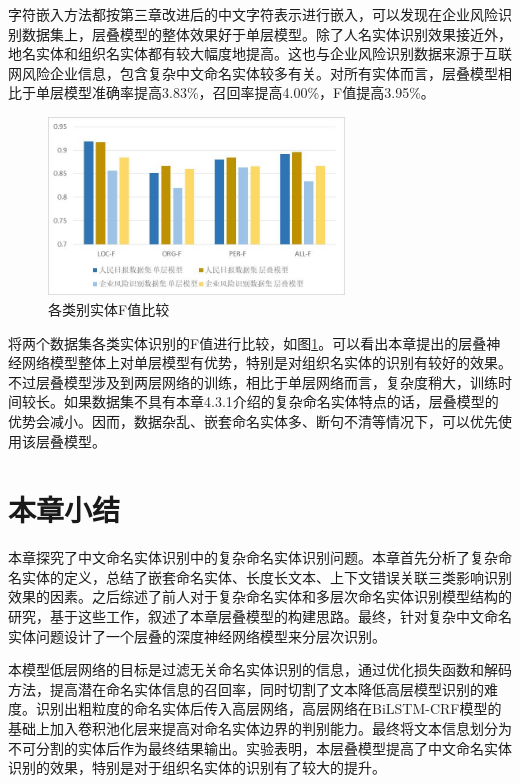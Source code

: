 \documentclass[winfonts,master,oneside,nobackinfo]{njuthesis}
\begin{document}
字符嵌入方法都按第三章改进后的中文字符表示进行嵌入，可以发现在企业风险识别数据集上，层叠模型的整体效果好于单层模型。除了人名实体识别效果接近外，地名实体和组织名实体都有较大幅度地提高。这也与企业风险识别数据来源于互联网风险企业信息，包含复杂中文命名实体较多有关。对所有实体而言，层叠模型相比于单层模型准确率提高3.83\%，召回率提高4.00\%，F值提高3.95\%。


\begin{figure}[h]
\centering
\includegraphics[width=0.7\textwidth]{./figure/层叠模型F值比较.jpg}
\caption{各类别实体F值比较}
\label{compare}
\end{figure}

将两个数据集各类实体识别的F值进行比较，如图\ref{compare}。可以看出本章提出的层叠神经网络模型整体上对单层模型有优势，特别是对组织名实体的识别有较好的效果。不过层叠模型涉及到两层网络的训练，相比于单层网络而言，复杂度稍大，训练时间较长。如果数据集不具有本章4.3.1介绍的复杂命名实体特点的话，层叠模型的优势会减小。因而，数据杂乱、嵌套命名实体多、断句不清等情况下，可以优先使用该层叠模型。


\section{本章小结}

本章探究了中文命名实体识别中的复杂命名实体识别问题。本章首先分析了复杂命名实体的定义，总结了嵌套命名实体、长度长文本、上下文错误关联三类影响识别效果的因素。之后综述了前人对于复杂命名实体和多层次命名实体识别模型结构的研究，基于这些工作，叙述了本章层叠模型的构建思路。最终，针对复杂中文命名实体问题设计了一个层叠的深度神经网络模型来分层次识别。

本模型低层网络的目标是过滤无关命名实体识别的信息，通过优化损失函数和解码方法，提高潜在命名实体信息的召回率，同时切割了文本降低高层模型识别的难度。识别出粗粒度的命名实体后传入高层网络，高层网络在BiLSTM-CRF模型的基础上加入卷积池化层来提高对命名实体边界的判别能力。最终将文本信息划分为不可分割的实体后作为最终结果输出。实验表明，本层叠模型提高了中文命名实体识别的效果，特别是对于组织名实体的识别有了较大的提升。
\end{document}

